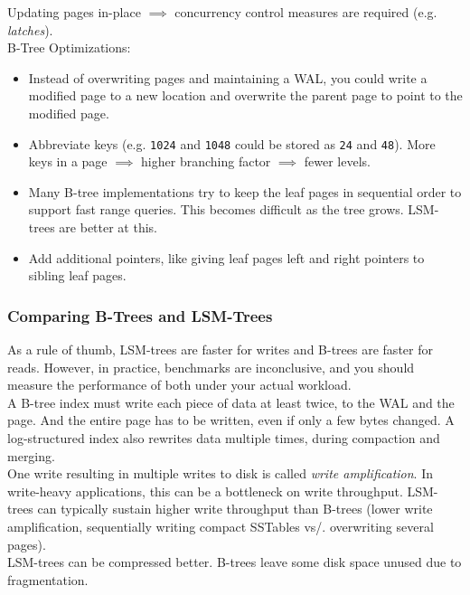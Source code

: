 \documentclass[12pt, titlepage]{article}
\begin{document}
Updating pages in-place $\implies$ concurrency control measures are required (e.g. \textit{latches}). \\

B-Tree Optimizations:

\begin{itemize}
    \item Instead of overwriting pages and maintaining a WAL, you could write a modified page to a new location and overwrite the parent page to point to the modified page.
    \item Abbreviate keys (e.g. \texttt{1024} and \texttt{1048} could be stored as \texttt{24} and \texttt{48}). More keys in a page $\implies$ higher branching factor $\implies$ fewer levels.
    \item Many B-tree implementations try to keep the leaf pages in sequential order to support fast range queries. This becomes difficult as the tree grows. LSM-trees are better at this.
    \item Add additional pointers, like giving leaf pages left and right pointers to sibling leaf pages.
\end{itemize}

\subsubsection{Comparing B-Trees and LSM-Trees}

As a rule of thumb, LSM-trees are faster for writes and B-trees are faster for reads. However, in practice, benchmarks are inconclusive, and you should measure the performance of both under your actual workload. \\

A B-tree index must write each piece of data at least twice, to the WAL and the page. And the entire page has to be written, even if only a few bytes changed. A log-structured index also rewrites data multiple times, during compaction and merging. \\

One write resulting in multiple writes to disk is called \textit{write amplification}. In write-heavy applications, this can be a bottleneck on write throughput. LSM-trees can typically sustain higher write throughput than B-trees (lower write amplification, sequentially writing compact SSTables vs/. overwriting several pages). \\

LSM-trees can be compressed better. B-trees leave some disk space unused due to fragmentation. \\
\end{document}
